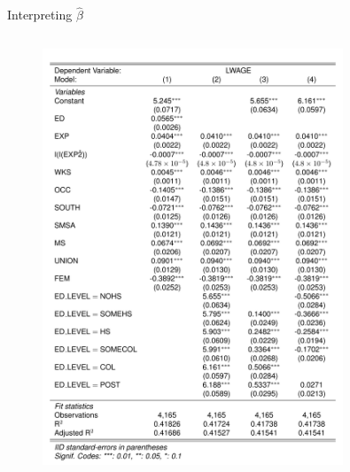 \begin{frame}{Interpreting $\widehat{\beta}$}
\begin{columns}
\begin{column}{0.5\textwidth}
\begin{figure}
	\includegraphics [width=0.8\textwidth]	{table_1}
\end{figure}
\end{column}
\end{columns}	
\end{frame}



